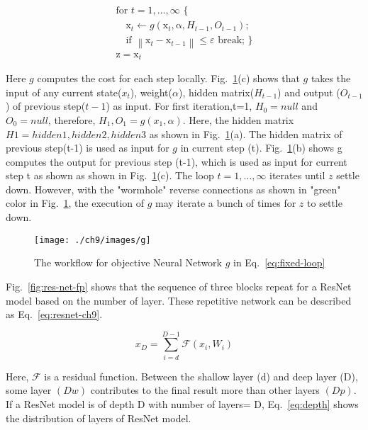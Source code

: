\documentclass{article}
\begin{document}
\clearpage
\begin{equation}
\begin{array}{l}
\text{for $t=1, \ldots, \infty$ \{} \\
\quad \mathrm{x}_{t} \leftarrow g\left(\mathrm{x}_t, \mathrm{\alpha}, H_{t-1},O_{t-1}\right)\text{;} \\
\quad \text{if $\left\|\mathrm{x}_{t}-\mathrm{x}_{t-1}\right\| \leq \varepsilon$ break; \}} \\
\mathrm{z}=\mathrm{x}_{t}
\end{array}
\label{eq:fixed-loop}
\end{equation}

Here $g$ computes the cost for each step locally. Fig.~\ref{fig:g}(c) shows that $g$ takes the input of any current state($x_{t}$), weight($\alpha$), hidden matrix($H_{t-1}$) and output ($O_{t-1}$) of previous step($t-1$) as input. For first iteration,t=1, $H_0=null$ and $O_0 =null$, therefore, $H_1, O_1= g(x_1, \alpha)$. Here, the hidden matrix $H1={hidden1, hidden2, hidden3}$ as shown in Fig.~\ref{fig:g}(a). The hidden matrix of previous step(t-1) is used as input for  $g$ in current step (t). Fig.~\ref{fig:g}(b) shows g computes the output for previous step (t-1), which is used as input for current step t as shown as shown in Fig.~\ref{fig:g}(c). The  loop $t=1, \ldots, \infty$ iterates until $z$ settle down. However, with the "wormhole" reverse connections as shown in "green" color in  Fig.~\ref{fig:g}, the execution of $g$ may iterate a bunch of times for $z$ to settle down.

\begin{figure}[htb]
    \centering
    \texttt{[image: ./ch9/images/g]}
    \caption{The workflow for objective Neural Network $g$ in Eq.~\eqref{eq:fixed-loop}}
    \label{fig:g}
\end{figure}
Fig.~\ref{fig:res-net-fp} shows that the sequence of three blocks repeat for a ResNet model based on the number of layer. These repetitive network can be described as Eq.~\eqref{eq:resnet-ch9}. 

\begin{equation}
   x_D=\sum_{i=d}^{D-1}\mathcal{F}(x_i, W_i)
   \label{eq:resnet-ch9}
\end{equation}

Here, $\mathcal{F}$ is a residual function. Between the shallow layer (d) and deep layer (D), some layer $(Dw)$ contributes to the final result more than other layers $(Dp)$. If a ResNet model is of depth D with number of layers= D, Eq.~\eqref{eq:depth} shows the distribution of layers of ResNet model.
\end{document}
